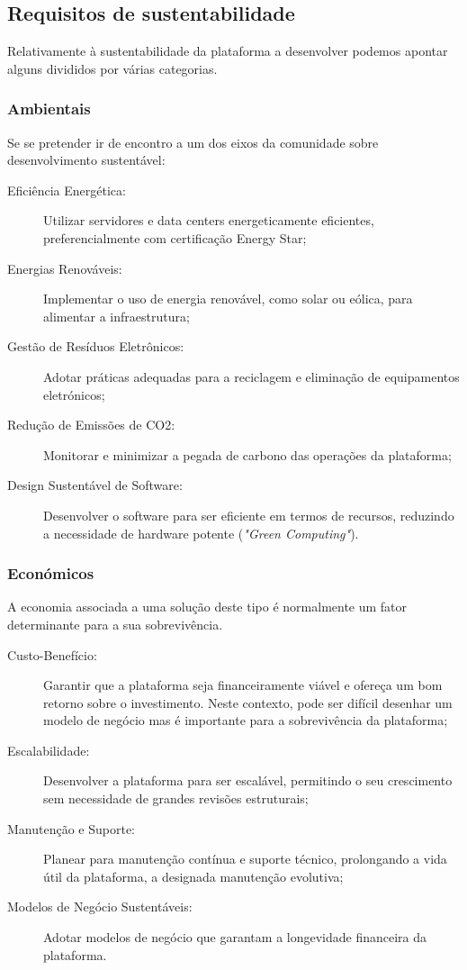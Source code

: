 \subsection{Requisitos de sustentabilidade}

Relativamente à sustentabilidade da plataforma a desenvolver podemos apontar alguns divididos por várias categorias.

\subsubsection{Ambientais}

Se se pretender ir de encontro a um dos eixos da comunidade sobre desenvolvimento sustentável:

\begin{description}
    \item[Eficiência Energética:] Utilizar servidores e data centers energeticamente eficientes, preferencialmente com 
    certificação Energy Star;
    \item[Energias Renováveis:] Implementar o uso de energia renovável, como solar ou eólica, para alimentar a infraestrutura;
    \item[Gestão de Resíduos Eletrônicos:] Adotar práticas adequadas para a reciclagem e eliminação de equipamentos eletrónicos;
    \item[Redução de Emissões de CO2:] Monitorar e minimizar a pegada de carbono das operações da plataforma;   
    \item[Design Sustentável de Software:] Desenvolver o software para ser eficiente em termos de recursos, reduzindo a 
    necessidade de hardware potente (\emph{"Green Computing"}).
\end{description}

\subsubsection{Económicos}

A economia associada a uma solução deste tipo é normalmente um fator determinante para a sua sobrevivência.

\begin{description}
    \item[Custo-Benefício:] Garantir que a plataforma seja financeiramente viável e ofereça um bom retorno sobre o investimento.
    Neste contexto, pode ser difícil desenhar um modelo de negócio mas é importante para a sobrevivência da plataforma;
    \item[Escalabilidade:] Desenvolver a plataforma para ser escalável, permitindo o seu crescimento sem necessidade de grandes 
    revisões estruturais;
    \item[Manutenção e Suporte:] Planear para manutenção contínua e suporte técnico, prolongando a vida útil da plataforma, a 
    designada manutenção evolutiva;
    \item[Modelos de Negócio Sustentáveis:] Adotar modelos de negócio que garantam a longevidade financeira da plataforma.
\end{description}    

